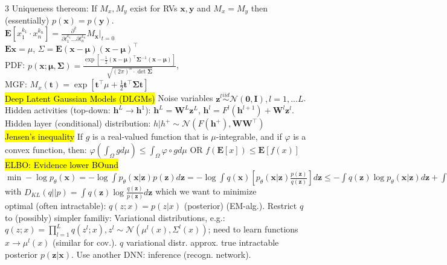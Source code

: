 \documentclass[11pt,landscape]{article}
\DeclareRobustCommand{\hlgray}[1]{{\sethlcolor{OliveGreen}\hl{#1}}}
\begin{document}
\begin{multicols*}{3}
Uniqueness thereom: If $M_x,M_y$ exist for RVs $\mathbf{x}, \mathbf{y}$ and $M_x=M_y$ then (essentially) $p(\mathbf{x})=p(\mathbf{y})$. \\
$\mathbf{E}[x^{k_1}_1 \cdot x^{k_n}_n] = \frac{\partial^k}{\partial t^{k_1}_1 ... \partial t_n^{k_n}}M_\mathbf{x}|_{t=0}$ \\
$\mathbf{Ex}=\mu$, 
$\Sigma=\mathbf{E}(\mathbf{x}-\mathbf{\mu})(\mathbf{x}-\mathbf{\mu})^\top$ \\
PDF: $p(\mathbf{x};\mathbf{\mu},\mathbf{\Sigma}) = \frac{\exp[-\frac{1}{2}(\mathbf{x}-\mathbf{\mu})^\top\mathbf{\Sigma}^{-1}(\mathbf{x}-\mathbf{\mu})]}{\sqrt{(2\pi)^n\cdot \det{\mathbf{\Sigma}}}}$, \\
MGF: $M_x(\mathbf{t})=\exp[\mathbf{t}^\top\mu + \frac{1}{2}\mathbf{t}^\top\mathbf{\Sigma}\mathbf{t}]$\\
\hl{Deep Latent Gaussian Models (DLGMs)} 
Noise variables $\mathbf{z}^l \overset{iid}{\sim}\mathcal{N}(\mathbf{0},\mathbf{I}), l=1,...L$. 
Hidden activities (top-down: $\mathbf{h}^L\rightarrow \mathbf{h}^1$): 
$\mathbf{h}^L=\mathbf{W}^L\mathbf{z}^L$, $\mathbf{h}^l=F^l(\mathbf{h}^{l+1})+\mathbf{W}^l\mathbf{z}^l$. 
Hidden layer (conditional) distribution:
$h|h^+\sim\mathcal{N}(F(\mathbf{h}^+),\mathbf{WW^\top})$ \\
\hlgray{Jensen's inequality}
If $g$ is a real-valued function that is $\mu$-integrable, and if $\varphi$ is a convex function, then: 
$\varphi(\int_\Omega g d \mu) \leq \int_\Omega \varphi \circ g d\mu$ OR $f(\mathbf{E}[x])\leq \mathbf{E}[f(x)]$ \\
\hlgray{ELBO: Evidence lower BOund} 
$\min -\log p_\theta(\mathbf{x}) = - \log \int p_\theta(\mathbf{x}|\mathbf{z})p(\mathbf{z})d\mathbf{z}=- \log \int q(\mathbf{x})\left[p_\theta(\mathbf{x}|\mathbf{z})\frac{p(\mathbf{z})}{q(\mathbf{z})}\right]d\mathbf{z}\leq -\int q(\mathbf{z})\log p_\theta (\mathbf{x}|\mathbf{z})d\mathbf{z} +\int q(\mathbf{z})\log \frac{q(\mathbf{z})}{p(\mathbf{z})}d\mathbf{z} =:\mathcal{F}(\theta,q;x)$ with $D_{KL}(q||p)=\int q(\mathbf{z})\log \frac{q(\mathbf{z})}{p(\mathbf{z})}d\mathbf{z}$ which we want to minimize\\
optimal (often intractable): $q(z;x) = p(z|x)$ (posterior) (EM-alg.). 
Restrict $q$ to (possibly) simpler familiy: Variational distributions, e.g.:
$q(z;x)=\prod_{l=1}^L q(z^l;x), z^l \sim \mathcal{N}(\mu^l(x),\Sigma^l(x))$; need to learn functions $x\rightarrow \mu^l(x)$ (similar for cov.). $q$ variational distr. approx. true intractable posterior $p(\mathbf{z}|\mathbf{x})$. Use another DNN: inference (recogn. network). \\

\end{multicols*}
\end{document}
